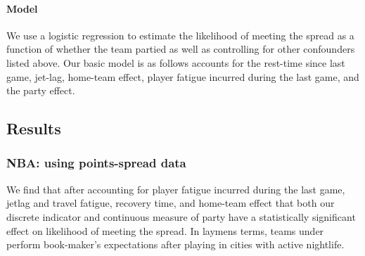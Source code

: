 \documentclass[letterpaper,12pt]{article}
\begin{document}
\paragraph{Model} We use a logistic regression to estimate the likelihood of meeting
the spread as a function of whether the team partied as well as controlling for other confounders
listed above. Our basic model is as follows accounts for the rest-time since
last game, jet-lag, home-team effect, player fatigue incurred during the last game,
and the party effect.

\subsection{Results}
\subsubsection{NBA: using points-spread data}
We find that after accounting for player fatigue incurred during the last game, jetlag and travel fatigue, recovery time, and home-team effect that both our discrete indicator and continuous measure of party
have a statistically significant effect on likelihood of meeting the spread.
In laymens terms, teams under perform book-maker's expectations after playing in cities 
with active nightlife.
\end{document}
